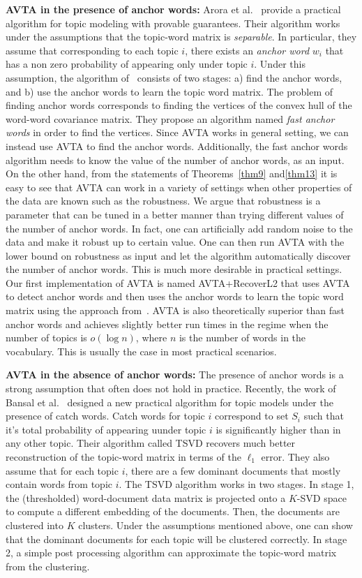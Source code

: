 \documentclass[]{article}
\begin{document}
	\noindent \textbf{AVTA in the presence of anchor words:}
	Arora et al.~\cite{arora2013practical} provide a practical algorithm for topic modeling with provable guarantees. Their algorithm works under the assumptions that the topic-word matrix is {\em separable}. In particular, they assume that corresponding to each topic $i$, there exists an {\em anchor word} $w_i$ that has a non zero probability of appearing only under topic $i$. Under this assumption, the algorithm of~\cite{arora2013practical} consists of two stages: a) find the anchor words, and b) use the anchor words to learn the topic word matrix. The problem of finding anchor words corresponds to finding the vertices of the convex hull of the word-word covariance matrix.  They propose an algorithm named {\em fast anchor words} in order to find the vertices. Since AVTA works in general setting, we can instead use AVTA to find the anchor words. Additionally, the fast anchor words algorithm needs to know the value of the number of anchor words, as an input. On the other hand, from the statements of Theorems~\ref{thm9} and\ref{thm13} it is easy to see that AVTA can work in a variety of settings when other properties of the data are known such as the robustness. We argue that robustness is a parameter that can be tuned in a better manner than trying different values of  the number of anchor words. In fact, one can artificially add random noise to the data and make it robust up to certain value. One can then run AVTA with the lower bound on robustness as input and let the algorithm automatically discover the number of anchor words. This is much more desirable in practical settings. Our first implementation of AVTA is named AVTA+RecoverL2 that uses AVTA to detect anchor words and then uses the anchor words to learn the topic word matrix using the approach from~\cite{arora2013practical}. AVTA is also theoretically superior than fast anchor words and achieves slightly better run times in the regime when the number of topics is $o(\log n)$, where $n$ is the number of words in the vocabulary. This is usually the case in most practical scenarios. 
	
	
	\noindent \textbf{AVTA in the absence of anchor words:} The presence of anchor words is a strong assumption that often does not hold in practice. Recently, the work of Bansal et al.~\cite{bansal2014provable} designed a new practical algorithm for topic models under the presence of catch words. Catch words for topic $i$ correspond to set $S_i$ such that it's total probability of appearing uunder topic $i$ is significantly higher than in any other topic. Their algorithm called TSVD recovers much better reconstruction of the topic-word matrix in terms of the $\ell_1$ error. They also assume that for each topic $i$, there are a few dominant documents that mostly contain words from topic $i$. The TSVD algorithm works in two stages. In stage 1, the (thresholded) word-document data matrix is projected onto a $K$-SVD space to compute a different embedding of the documents. Then, the documents are clustered into $K$ clusters. Under the assumptions mentioned above, one can show that the dominant documents for each topic will be clustered correctly. In stage 2, a simple post processing algorithm can approximate the topic-word matrix from the clustering.
	
\end{document}
